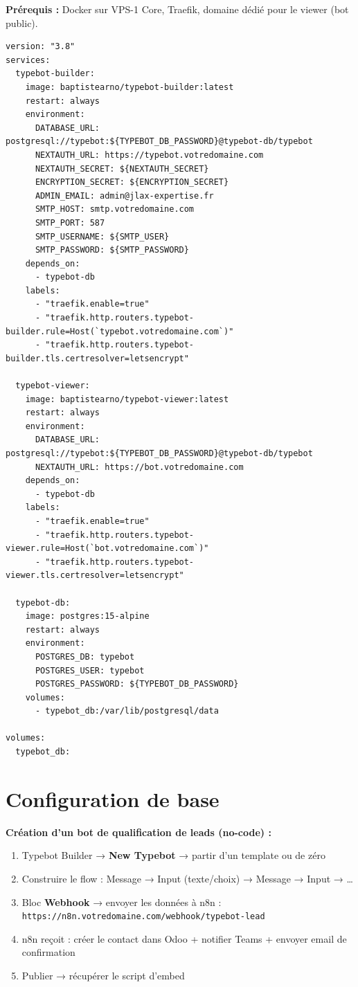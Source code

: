 \documentclass[11pt, a4paper]{article}
\begin{document}
\textbf{Prérequis :} Docker sur VPS-1 Core, Traefik, domaine dédié pour le viewer (bot public).

\begin{lstlisting}[style=yamlstyle, caption={docker-compose.yml — Typebot (Builder + Viewer)}]
version: "3.8"
services:
  typebot-builder:
    image: baptistearno/typebot-builder:latest
    restart: always
    environment:
      DATABASE_URL: postgresql://typebot:${TYPEBOT_DB_PASSWORD}@typebot-db/typebot
      NEXTAUTH_URL: https://typebot.votredomaine.com
      NEXTAUTH_SECRET: ${NEXTAUTH_SECRET}
      ENCRYPTION_SECRET: ${ENCRYPTION_SECRET}
      ADMIN_EMAIL: admin@jlax-expertise.fr
      SMTP_HOST: smtp.votredomaine.com
      SMTP_PORT: 587
      SMTP_USERNAME: ${SMTP_USER}
      SMTP_PASSWORD: ${SMTP_PASSWORD}
    depends_on:
      - typebot-db
    labels:
      - "traefik.enable=true"
      - "traefik.http.routers.typebot-builder.rule=Host(`typebot.votredomaine.com`)"
      - "traefik.http.routers.typebot-builder.tls.certresolver=letsencrypt"

  typebot-viewer:
    image: baptistearno/typebot-viewer:latest
    restart: always
    environment:
      DATABASE_URL: postgresql://typebot:${TYPEBOT_DB_PASSWORD}@typebot-db/typebot
      NEXTAUTH_URL: https://bot.votredomaine.com
    depends_on:
      - typebot-db
    labels:
      - "traefik.enable=true"
      - "traefik.http.routers.typebot-viewer.rule=Host(`bot.votredomaine.com`)"
      - "traefik.http.routers.typebot-viewer.tls.certresolver=letsencrypt"

  typebot-db:
    image: postgres:15-alpine
    restart: always
    environment:
      POSTGRES_DB: typebot
      POSTGRES_USER: typebot
      POSTGRES_PASSWORD: ${TYPEBOT_DB_PASSWORD}
    volumes:
      - typebot_db:/var/lib/postgresql/data

volumes:
  typebot_db:
\end{lstlisting}

\section{Configuration de base}

\textbf{Création d'un bot de qualification de leads (no-code) :}
\begin{enumerate}
  \item Typebot Builder → \textbf{New Typebot} → partir d'un template ou de zéro
  \item Construire le flow : Message → Input (texte/choix) → Message → Input → …
  \item Bloc \textbf{Webhook} → envoyer les données à n8n : \texttt{https://n8n.votredomaine.com/webhook/typebot-lead}
  \item n8n reçoit : créer le contact dans Odoo + notifier Teams + envoyer email de confirmation
  \item Publier → récupérer le script d'embed
\end{enumerate}
\end{document}
